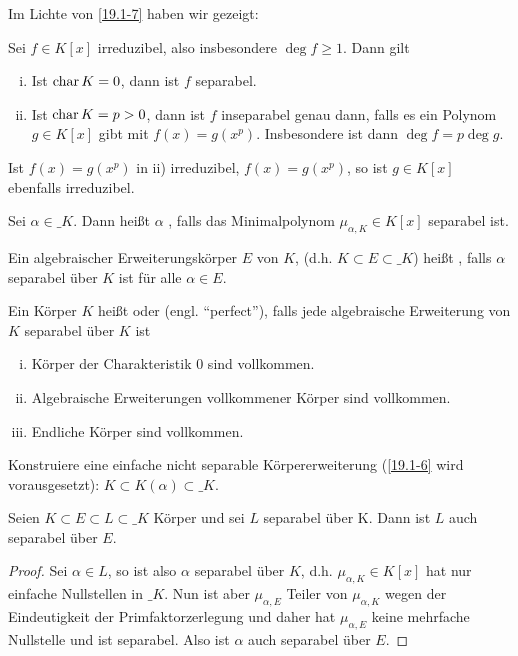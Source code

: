 Im Lichte von \ref{19.1-7} haben wir gezeigt:

\begin{st} \label{dup:19.1-8}
	Sei $f \in K[x]$ irreduzibel, also insbesondere $\deg f \ge 1$.
	Dann gilt
	\begin{enumerate}[i)]
		\item
			Ist $\operatorname{char} K = 0$, dann ist $f$ separabel.
		\item
			Ist $\operatorname{char} K = p > 0$, dann ist $f$ inseparabel genau dann, falls es ein Polynom $g \in K[x]$ gibt mit $f(x) = g(x^p)$.
			Insbesondere ist dann $\deg f = p \deg g$.
	\end{enumerate}
	Ist $f(x) = g(x^p)$ in ii) irreduzibel, $f(x) = g(x^p)$, so ist $g \in K[x]$ ebenfalls irreduzibel.
\end{st}

\begin{df} \label{dup:19.1-9}
	Sei $\alpha \in \_K$.
	Dann heißt $\alpha$ , falls das Minimalpolynom $\mu_{\alpha, K} \in K[x]$ separabel ist.

	Ein algebraischer Erweiterungskörper $E$ von $K$, (d.h. $K \subset E \subset \_K$) heißt , falls $\alpha$ separabel über $K$ ist für alle $\alpha \in E$.

	Ein Körper $K$ heißt  oder  (engl. “perfect”), falls jede algebraische Erweiterung von $K$ separabel über $K$ ist
\end{df}

\setcounter{thm}{5}
\begin{kor} \label{19.1-6}
	\begin{enumerate}[i)]
		\item
			Körper der Charakteristik $0$ sind vollkommen.
		\item
			Algebraische Erweiterungen vollkommener Körper sind vollkommen.
		\item
			Endliche Körper sind vollkommen.
	\end{enumerate}
\end{kor}

\begin{ex} \label{dup:19.1-7}
	Konstruiere eine einfache nicht separable Körpererweiterung (\ref{19.1-6} wird vorausgesetzt): $K \subset K(\alpha) \subset \_K$.
\end{ex}

\begin{lem} \label{19.1-8}
	Seien $K \subset E \subset L \subset \_K$ Körper und sei $L$ separabel über K.
	Dann ist $L$ auch separabel über $E$.
	\begin{proof}
		Sei $\alpha \in L$, so ist also $\alpha$ separabel über $K$, d.h. $\mu_{\alpha, K} \in K[x]$ hat nur einfache Nullstellen in $\_K$.
		Nun ist aber $\mu_{\alpha, E}$ Teiler von $\mu_{\alpha, K}$ wegen der Eindeutigkeit der Primfaktorzerlegung und daher hat $\mu_{\alpha, E}$ keine mehrfache Nullstelle und ist separabel.
		Also ist $\alpha$ auch separabel über $E$.
	\end{proof}
\end{lem}

